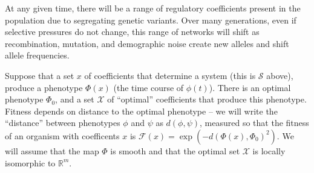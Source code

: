 \documentclass{article}
\newcommand{\plr}[1]{\todo[color=blue!25]{#1}}
\newcommand{\js}[1]{\todo[color=green!25]{#1}}
\newcommand{\plri}[1]{{\color{blue}\it #1}}
\newcommand{\plr}[1]{{\color{blue}\it #1}}
\newcommand{\js}[1]{{\color{green}\it #1}}
\newcommand{\plri}[1]{\plr{#1}}
\newcommand{\R}{\mathbb{R}}
\newcommand{\1}{\mathbbm{1}}
\newcommand{\Sys}{\mathcal{S}}
\newcommand{\fitx}{\mathcal{F}}
\newcommand{\optx}{\mathcal{X}}
\newcommand{\optph}{\Phi_0}
\newcommand{\dph}{d}
\begin{document}
At any given time, there will be a range of regulatory coefficients present in the population
due to segregating genetic variants.
Over many generations, even if selective pressures do not change,
this range of networks will shift 
as recombination, mutation, and demographic noise create new alleles and shift allele frequencies.

Suppose that a set $x$ of coefficients that determine a system (this is $\Sys$ above),
produce a phenotype $\Phi(x)$ (the time course of $\phi(t)$).
There is an optimal phenotype $\optph$,
and a set $\optx$ of ``optimal'' coefficients that produce this phenotype.
Fitness depends on distance to the optimal phenotype --
we will write the ``distance'' between phenotypes $\phi$ and $\psi$ as $\dph(\phi, \psi)$,
measured so that the fitness of an organism with coefficents $x$ is $\fitx(x) = \exp(-\dph(\Phi(x),\optph)^2)$. 
We will assume that the map $\Phi$ is smooth
and that the optimal set $\optx$ is locally isomorphic to $\R^m$.
\plr{say that better}

\end{document}
